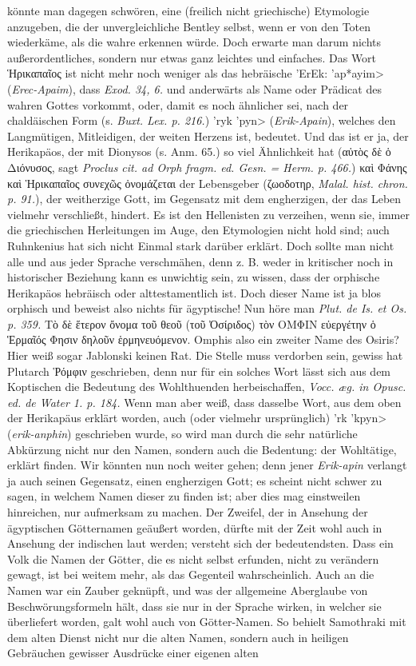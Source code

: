 \documentclass[a4paper, 11pt, oneside]{article}
\begin{document}
könnte man dagegen schwören, eine (freilich nicht griechische) Etymologie anzugeben, die der unvergleichliche Bentley selbst, wenn er von den Toten wiederkäme, als die wahre erkennen würde. Doch erwarte man darum nichts außerordentliches, sondern nur etwas ganz leichtes und einfaches. Das Wort Ἡρικαπαῖος ist nicht mehr noch weniger als das hebräische \foreignlanguage{hebrew}{\<'ErEk: 'ap*ayim>} (\emph{Erec-Apaim}), dass \emph{Exod. 34, 6.} und anderwärts als Name oder Prädicat des wahren Gottes vorkommt, oder, damit es noch ähnlicher sei, nach der chaldäischen Form (s. \emph{Buxt. Lex. p. 216.}) \foreignlanguage{hebrew}{\<'ryk 'pyn>} (\emph{Erik-Apain}), welches den Langmütigen, Mitleidigen, der weiten Herzens ist, bedeutet. Und das ist er ja, der Herikapäos, der mit Dionysos (s. Anm. 65.) so viel Ähnlichkeit hat (αὐτὸς δὲ ὁ Διόνυσος, sagt \emph{Proclus cit. ad Orph fragm. ed. Gesn. = Herm. p. 466.}) καὶ Φάνης καὶ Ἡρικαπαῖος συνεχῶς ὀνομάζεται der Lebensgeber (ζωοδοτηρ, \emph{Malal. hist. chron. p. 91.}), der weitherzige Gott, im Gegensatz mit dem engherzigen, der das Leben vielmehr verschließt, hindert. Es ist den Hellenisten zu verzeihen, wenn sie, immer die griechischen Herleitungen im Auge, den Etymologien nicht hold sind; auch Ruhnkenius hat sich nicht Einmal stark darüber erklärt. Doch sollte man nicht alle und aus jeder Sprache verschmähen, denn z. B. weder in kritischer noch in historischer Beziehung kann es unwichtig sein, zu wissen, dass der orphische Herikapäos hebräisch oder alttestamentlich ist. Doch dieser Name ist ja blos orphisch und beweist also nichts für ägyptische! Nun höre man \emph{Plut. de Is. et Os. p. 359.} Τὸ δὲ ἕτερον ὄνομα τοῦ θεοῦ (τοῦ Ὀσίριδος) τὸν ΟΜΦΙΝ εὐεργέτην ὁ Ἑρμαῖός Φησιν δηλοῦν ἑρμηνευόμενον. Omphis also ein zweiter Name des Osiris? Hier weiß sogar Jablonski keinen Rat. Die Stelle muss verdorben sein, gewiss hat Plutarch Ῥόμφιν geschrieben, denn nur für ein solches Wort lässt sich aus dem Koptischen die Bedeutung des Wohlthuenden herbeischaffen, \emph{Vocc. æg. in Opusc. ed. de Water 1. p. 184.} Wenn man aber weiß, dass dasselbe Wort, aus dem oben der Herikapäus erklärt worden, auch (oder vielmehr ursprünglich) \foreignlanguage{hebrew}{\<'rk 'kpyn>} (\emph{erik-anphin}) geschrieben wurde, so wird man durch die sehr natürliche Abkürzung nicht nur den Namen, sondern auch die Bedentung: der Wohltätige, erklärt finden. Wir könnten nun noch weiter gehen; denn jener \emph{Erik-apin} verlangt ja auch seinen Gegensatz, einen engherzigen Gott; es scheint nicht schwer zu sagen, in welchem Namen dieser zu finden ist; aber dies mag einstweilen hinreichen, nur aufmerksam zu machen. Der Zweifel, der in Ansehung der ägyptischen Götternamen geäußert worden, dürfte mit der Zeit wohl auch in Ansehung der indischen laut werden; versteht sich der bedeutendsten. Dass ein Volk die Namen der Götter, die es nicht selbst erfunden, nicht zu verändern gewagt, ist bei weitem mehr, als das Gegenteil wahrscheinlich. Auch an die Namen war ein Zauber geknüpft, und was der allgemeine Aberglaube von Beschwörungsformeln hält, dass sie nur in der Sprache wirken, in welcher sie überliefert worden, galt wohl auch von Götter-Namen. So behielt Samothraki mit dem alten Dienst nicht nur die alten Namen, sondern auch in heiligen Gebräuchen gewisser Ausdrücke einer eigenen alten 
\end{document}
